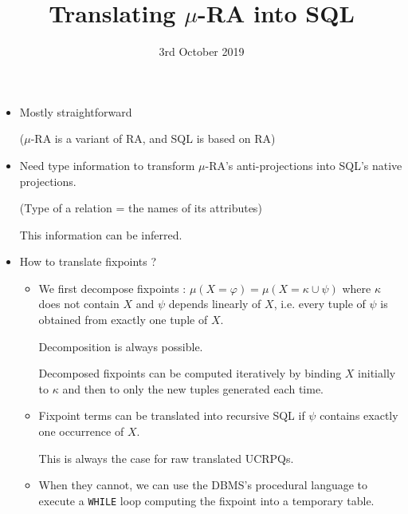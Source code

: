 \documentclass{beamer}
\newcommand{\mus}{{$\mu$-RA}}
\newcommand{\fixpt}[2][X]{\mu {\left(#1=#2\right)}}
\newcommand*\blue[1]{{\color{blue}#1}}
\newcommand*\dblue[1]{{\color{darkblue}#1}}
\newcommand*\green[1]{{\color{darkgreen}#1}}
\begin{document}
\title{Translating \mus{} into SQL}
\date{3rd October 2019}

\begin{frame}
  \titlepage
\end{frame}

\begin{frame}
  \begin{itemize}
  \item Mostly straightforward

    (\mus{} is a variant of RA, and SQL is based on RA)
    \pause
  \item Need \blue{type information} to transform \mus{}’s anti-projections into SQL’s native projections.

    (\blue{Type} of a relation = the names of its attributes)

    \noindent\pause\hfill\green{This information can be inferred.}

    \pause
  \item How to translate fixpoints ?
    \begin{itemize}
      \pause
    \item We first \blue{decompose} fixpoints :
      $\fixpt\varphi = \fixpt{\kappa\cup\psi}$ where $\kappa$ does not
      contain $X$ and $\psi$ depends \blue{linearly} of $X$, i.e.
      every tuple of $\psi$ is obtained from exactly one tuple of $X$.

      \pause\dblue{Theorem:} Decomposition is always possible.

      \pause\dblue{Property:} Decomposed fixpoints can be computed
      iteratively by binding $X$ initially to $\kappa$ and then to
      only the new tuples generated each time.
\pause\item Fixpoint terms can be translated into recursive SQL
\blue{if} $\psi$ contains exactly one occurrence of $X$.

\noindent\pause\hfill\green{This is always the case for raw translated
UCRPQs.}
\pause\item When they cannot, we can use the DBMS’s procedural
language to execute a \texttt{WHILE} loop computing the fixpoint into
a temporary table.
  \end{itemize}
\end{itemize}
\end{frame}
\end{document}

